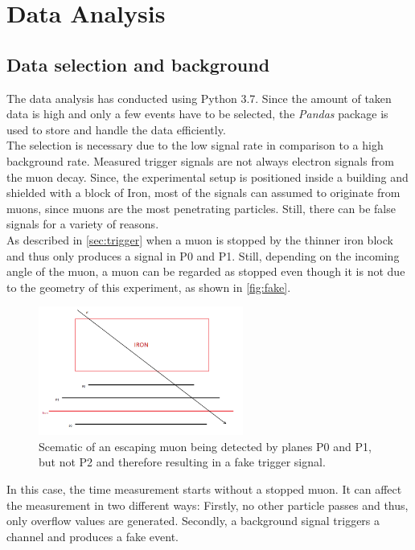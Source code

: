 \chapter{Data Analysis}
\label{sec:data_analysis}
\section{Data selection and background}
The data analysis has conducted using Python 3.7. Since the amount of taken data is high and only a few events have to be selected, the \textit{Pandas} package \cite{pandas} is used to store and handle the data efficiently. \\

The selection is necessary due to the low signal rate in comparison to a high background rate.
Measured trigger signals are not always electron signals from the muon decay. Since, the experimental setup is positioned inside a building and shielded with a block of Iron, most of the signals can assumed to originate from muons, since muons are the most penetrating particles. Still, there can be false signals for a variety of reasons. \\

As described in \autoref{sec:trigger} when a muon is stopped by the thinner iron block and thus only produces a signal in P0 and P1. Still, depending on the incoming angle of the muon, a muon can be regarded as stopped even though it is not due to the geometry of this experiment, as shown in \autoref{fig:fake}.

\begin{figure}
	 \centering
	 \includegraphics[width=0.6\textwidth]{figures/falsestopping.png}
	 \caption{Scematic of an escaping muon being detected by planes P0 and P1, but not P2 and therefore resulting in a fake trigger signal.}
	 \label{fig:fake}
\end{figure}

In this case, the time measurement starts without a stopped muon. It can affect the measurement in two different ways: Firstly, no other particle passes and thus, only overflow values are generated. Secondly, a background signal triggers a channel and produces a fake event.\\

